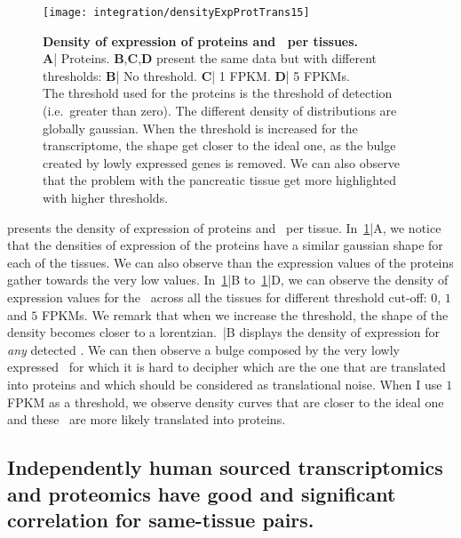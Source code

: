 \begin{figure}[!htbp]
    \texttt{[image: integration/densityExpProtTrans15]}\centering
    \caption[Density of expression of proteins and \mRNAs\ per
    tissues.]
    {\label{fig:densityExpProtTrans15}\textbf{Density of expression of
    proteins and \mRNAs\ per tissues.} \\\textbf{A}| Proteins.
    \textbf{B},\textbf{C},\textbf{D} present the same data but with
    different thresholds:
    \textbf{B}| No threshold. \textbf{C}| 1 \gls{FPKM}.
    \textbf{D}| 5 \glspl{FPKM}.\\The threshold used for the proteins is the
    threshold of
    detection (i.e.\ greater than zero). The different density of distributions are
    globally gaussian. When the threshold is increased for the transcriptome, the
    shape get closer to the ideal one, as the bulge created by lowly expressed
    genes is removed. We can also observe that the problem with the pancreatic
    tissue get more highlighted with higher thresholds.}
\end{figure}

 presents the density of expression
of proteins and \mRNAs\ per tissue. In~\cref{fig:densityExpProtTrans15}|A,
we notice that the densities of expression of the proteins have a similar gaussian
shape for each of the tissues. We can also observe than the expression values
of the proteins gather towards the very low values.
In~\cref{fig:densityExpProtTrans15}|B to~\cref{fig:densityExpProtTrans15}|D,
we can observe the density of expression values for
the \mRNAs\ across all the tissues for
different threshold cut-off: $0$, $1$ and $5$ \glspl{FPKM}.
We remark that when we increase the threshold, the shape
of the density becomes closer to a lorentzian.~|B
displays the density of expression for \emph{any} detected \mRNA\@. We can
then observe a bulge composed by the very lowly expressed \mRNAs\, for which it
is hard to decipher which are the one that are translated into proteins and which
should be considered as translational noise. When I use $1$ \gls{FPKM} as a threshold,
we observe density curves that are closer to the ideal one and these \mRNAs\ are
more likely translated into proteins.


\subsection{Independently human sourced transcriptomics and proteomics
have good and significant correlation for same-tissue pairs.}
\label{subsec:IntegrationGoodCorrProtTrans}

